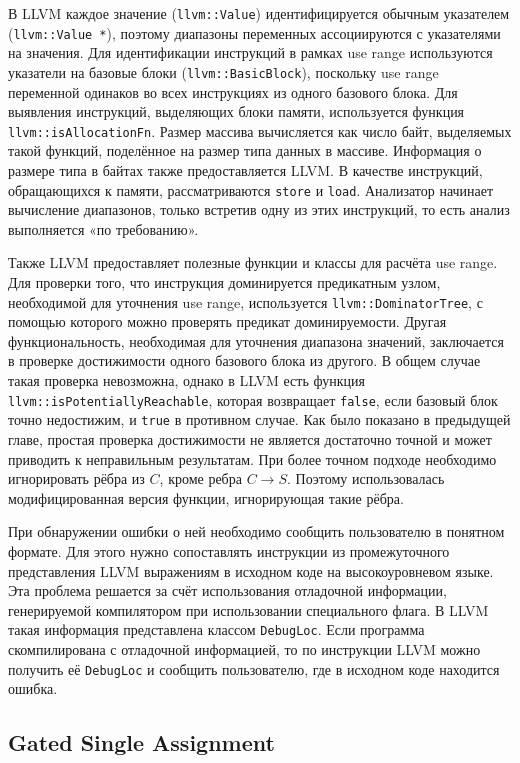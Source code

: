 В LLVM каждое значение (\texttt{llvm::Value}) идентифицируется обычным
указателем (\texttt{llvm::Value *}), поэтому диапазоны переменных
ассоциируются с указателями на значения. Для идентификации инструкций
в рамках use range используются указатели на базовые блоки
(\texttt{llvm::BasicBlock}), поскольку use range переменной одинаков
во всех инструкциях из одного базового блока. Для выявления
инструкций, выделяющих блоки памяти, используется функция
\texttt{llvm::isAllocationFn}. Размер массива вычисляется как число
байт, выделяемых такой функций, поделённое на размер типа данных в
массиве. Информация о размере типа в байтах также предоставляется
LLVM. В качестве инструкций, обращающихся к памяти, рассматриваются
\texttt{store} и \texttt{load}. Анализатор начинает вычисление
диапазонов, только встретив одну из этих инструкций, то есть анализ
выполняется «по требованию».

Также LLVM предоставляет полезные функции и классы для расчёта use
range. Для проверки того, что инструкция доминируется предикатным
узлом, необходимой для уточнения use range, используется
\texttt{llvm::DominatorTree}, с помощью которого можно проверять
предикат доминируемости. Другая функциональность, необходимая для
уточнения диапазона значений, заключается в проверке достижимости
одного базового блока из другого. В общем случае такая проверка
невозможна, однако в LLVM есть функция
\texttt{llvm::isPotentiallyReachable}, которая возвращает
\texttt{false}, если базовый блок точно недостижим, и \texttt{true} в
противном случае. Как было показано в предыдущей главе, простая
проверка достижимости не является достаточно точной и может приводить
к неправильным результатам. При более точном подходе необходимо
игнорировать рёбра из $C$, кроме ребра $C \rightarrow S$. Поэтому
использовалась модифицированная версия функции, игнорирующая такие
рёбра.

При обнаружении ошибки о ней необходимо сообщить пользователю в
понятном формате. Для этого нужно сопоставлять инструкции из
промежуточного представления LLVM выражениям в исходном коде на
высокоуровневом языке. Эта проблема решается за счёт использования
отладочной информации, генерируемой компилятором при использовании
специального флага. В LLVM такая информация представлена классом
\texttt{DebugLoc}. Если программа скомпилирована с отладочной информацией, то
по инструкции LLVM можно получить её \texttt{DebugLoc} и сообщить
пользователю, где в исходном коде находится ошибка.

\subsection{Gated Single Assignment}

